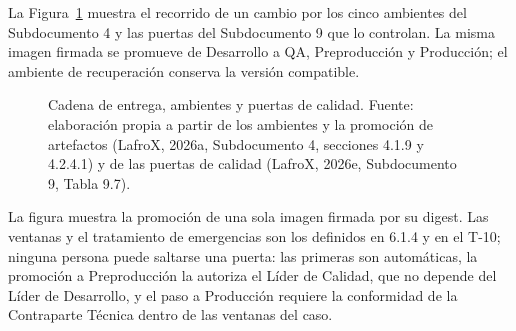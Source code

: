 La Figura~\ref{fig:sd6-cadena} muestra el recorrido de un cambio por los cinco ambientes del Subdocumento 4 y las puertas del Subdocumento 9 que lo controlan. La misma imagen firmada se promueve de Desarrollo a QA, Preproducción y Producción; el ambiente de recuperación conserva la versión compatible.

\begin{figure}[htbp]
\centering
{}
\caption[Cadena de entrega, ambientes y puertas de calidad.]{Cadena de entrega, ambientes y puertas de calidad. Fuente: elaboración propia a partir de los ambientes y la promoción de artefactos (LafroX, 2026a, Subdocumento 4, secciones 4.1.9 y 4.2.4.1) y de las puertas de calidad (LafroX, 2026e, Subdocumento 9, Tabla 9.7).}
\label{fig:sd6-cadena}
\end{figure}

La figura muestra la promoción de una sola imagen firmada por su digest. Las ventanas y el tratamiento de emergencias son los definidos en 6.1.4 y en el T-10; ninguna persona puede saltarse una puerta: las primeras son automáticas, la promoción a Preproducción la autoriza el Líder de Calidad, que no depende del Líder de Desarrollo, y el paso a Producción requiere la conformidad de la Contraparte Técnica dentro de las ventanas del caso.

